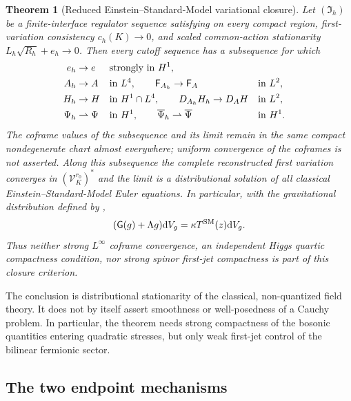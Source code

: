 \documentclass[11pt]{article}
\numberwithin{equation}{section}
\newtheorem{theorem}{Theorem}[section]
\theoremstyle{definition}
\theoremstyle{remark}
\newcommand{\dd}{\mathrm d}
\newcommand{\Vtest}{\mathscr V}
\newcommand{\Fcurv}{\mathsf F}
\newcommand{\Eins}{\mathsf G}
\newcommand{\bPsi}{\overline\Psi}
\newcommand{\dV}{\dd V}
\newcommand{\Iface}{\mathfrak I}
\begin{document}
\begin{theorem}[Reduced Einstein--Standard-Model variational closure]
\label{thm:reduced-closure}
Let $(\Iface_h)$ be a finite-interface regulator sequence satisfying
 on every compact region, first-variation
consistency $c_h(K)\to0$, and scaled common-action stationarity
$L_h\sqrt{R_h}+e_h\to0$.  Then every cutoff sequence has a subsequence for
which
\begin{align}
 e_h&\to e &&\text{strongly in }H^1,\notag\\
 A_h&\to A &&\text{in }L^4,\qquad
 \Fcurv_{A_h}\to\Fcurv_A &&\text{in }L^2,\notag\\
 H_h&\to H &&\text{in }H^1\cap L^4,\qquad
 D_{A_h}H_h\to D_AH &&\text{in }L^2,\notag\\
 \Psi_h&\rightharpoonup\Psi &&\text{in }H^1,\qquad
 \bPsi_h\rightharpoonup\bPsi &&\text{in }H^1.
 \label{eq:reduced-limits}
\end{align}
The coframe values of the subsequence and its limit remain in the same
compact nondegenerate chart almost everywhere; uniform convergence of the
coframes is not asserted.  Along this subsequence the complete reconstructed
first variation converges in $(\Vtest_K^{r_0})^*$ and the limit is a
distributional solution of all classical Einstein--Standard-Model Euler
equations.  In particular, with the gravitational distribution defined by
,
\begin{equation}
 (\Eins(g)+\Lambda g)\dV_g=\kappa T^{\rm SM}(z)\dV_g.
 \label{eq:reduced-Einstein-limit}
\end{equation}
Thus neither strong $L^\infty$ coframe convergence, an independent Higgs
quartic compactness condition, nor strong spinor first-jet compactness is
part of this closure criterion.
\end{theorem}

The conclusion is distributional stationarity of the classical,
non-quantized field theory. It does not by itself assert smoothness or
well-posedness of a Cauchy problem. In particular, the theorem needs strong
compactness of the bosonic quantities entering quadratic stresses, but
only weak first-jet control of the bilinear fermionic sector.

\subsection{The two endpoint mechanisms}
\label{subsec:endpoint-mechanisms}
\end{document}
